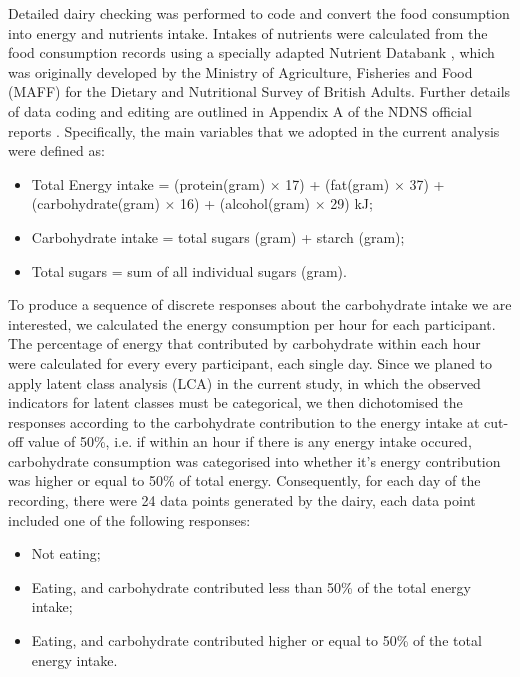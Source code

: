 Detailed dairy checking was performed to code and convert the food consumption into energy and nutrients intake. Intakes of nutrients were calculated from the food consumption records using a specially adapted Nutrient Databank \parencite{smithers1993maff}, which was originally developed by the Ministry of Agriculture, Fisheries and Food (MAFF) for the Dietary and Nutritional Survey of British Adults. Further details of data
coding and editing are outlined in Appendix A of the NDNS official reports \parencite{NDNSofficial}. Specifically, the main variables that we adopted in the current analysis were defined as: 

\begin{itemize}
	\item Total Energy intake = (protein(gram) $\times$ 17) + (fat(gram) $\times$ 37) + (carbohydrate(gram) $\times$ 16) + (alcohol(gram) $\times$ 29)  kJ;
	\item Carbohydrate intake = total sugars (gram) + starch (gram); 
	\item Total sugars = sum of all individual sugars (gram).
\end{itemize}

To produce a sequence of discrete responses about the carbohydrate intake we are interested, we calculated the energy consumption per hour for each participant. The percentage of energy that contributed by carbohydrate within each hour were calculated for every every participant, each single day. Since we planed to apply latent class analysis (LCA) in the current study, in which the observed indicators for latent classes must be categorical, we then dichotomised the responses according to the carbohydrate contribution to the energy intake at cut-off value of 50\%, i.e. if within an hour if there is any energy intake occured, carbohydrate consumption was categorised into whether it's energy contribution was higher or equal to 50\% of total energy. Consequently, for each day of the recording, there were 24 data points generated by the dairy, each data point included one of the following responses:

\begin{itemize}
	\item Not eating; 
	\item Eating, and carbohydrate contributed less than 50\% of the total energy intake;
	\item Eating, and carbohydrate contributed higher or equal to 50\% of the total energy intake.
\end{itemize}


